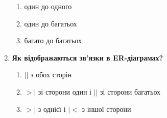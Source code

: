 \begin{enumerate}
\begin{enumerate}
    \item один до одного
    \item один до багатьох
    \item багато до багатьох
\end{enumerate}

\item \textbf{Як відображаються зв'язки в ER-діаграмах?}

\begin{enumerate}
    \item $||$ з обох сторін
    \item $>|$ зі сторони один і $||$ зі сторони багатьох
    \item $>|$ з однієї і $|<$ з іншої сторони
\end{enumerate}

\end{enumerate}
